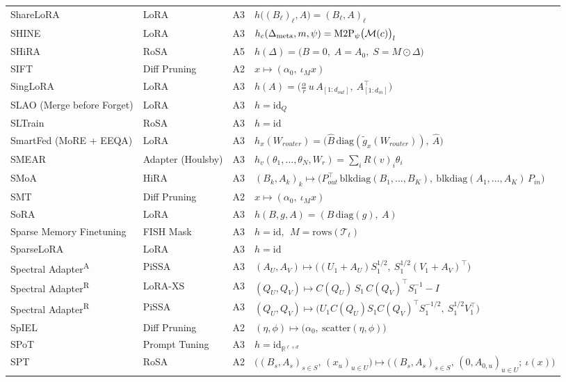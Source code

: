 \begin{longtable}{@{}>{\raggedright\arraybackslash}p{2.4cm}>{\raggedright\arraybackslash}p{2.4cm}c>{\raggedright\arraybackslash}p{8.6cm}@{}}
ShareLoRA & LoRA & A3 & $h\big((B_\ell)_\ell,A\big)=(B_\ell,A)_\ell$\\
SHINE & LoRA & A3 & $h_c(\Delta_{\rm meta},m,\psi)=\mathrm{M2P}_\psi\big(\mathcal M(c)\big)_l$\\
SHiRA & RoSA & A5 & $h(\Delta)=\big(B=0,\;A=A_0,\;S=M\odot\Delta\big)$\\
SIFT & Diff Pruning & A2 & $x\mapsto(\alpha_0,\ \iota_M x)$\\
SingLoRA & LoRA & A3 & $h(A)=\big(\tfrac\alpha r\,u\,A_{[1:d_{out}]},\ A_{[1:d_{in}]}^\top\big)$\\
SLAO (Merge before Forget) & LoRA & A3 & $h=\mathrm{id}_Q$\\
SLTrain & RoSA & A3 & $h=\mathrm{id}$\\
SmartFed (MoRE + EEQA) & LoRA & A3 & $h_x(W_{router})=\big(\widehat B\,\mathrm{diag}(\tilde g_x(W_{router})),\ \widehat A\big)$\\
SMEAR & Adapter (Houlsby) & A3 & $h_v(\theta_1,\dots,\theta_N,W_r)=\textstyle\sum_iR(v)_i\theta_i$\\
SMoA & HiRA & A3 & $(B_k,A_k)_k\mapsto\big(P_{out}^\top\,\mathrm{blkdiag}(B_1,\dots,B_K),\ \mathrm{blkdiag}(A_1,\dots,A_K)\,P_{in}\big)$\\
SMT & Diff Pruning & A2 & $x\mapsto(\alpha_0,\ \iota_M x)$\\
SoRA & LoRA & A3 & $h(B,g,A)=(B\,\mathrm{diag}(g),\ A)$\\
Sparse Memory Finetuning & FISH Mask & A3 & $h=\mathrm{id},\ \ M=\mathrm{rows}(\mathcal T_t)$\\
SparseLoRA & LoRA & A3 & $h=\mathrm{id}$\\
Spectral Adapter\textsuperscript{A} & PiSSA & A3 & $(A_U,A_V)\mapsto\big((U_1+A_U)S_1^{1/2},\ S_1^{1/2}(V_1+A_V)^\top\big)$\\
Spectral Adapter\textsuperscript{R} & LoRA-XS & A3 & $(Q_U,Q_V)\mapsto C(Q_U)\,S_1\,C(Q_V)^\top S_1^{-1}-I$\\
Spectral Adapter\textsuperscript{R} & PiSSA & A3 & $(Q_U,Q_V)\mapsto\big(U_1C(Q_U)S_1C(Q_V)^\top S_1^{-1/2},\ S_1^{1/2}V_1^\top\big)$\\
SpIEL & Diff Pruning & A2 & $(\eta,\phi)\mapsto\big(\alpha_0,\ \mathrm{scatter}(\eta,\phi)\big)$\\
SPoT & Prompt Tuning & A3 & $h=\mathrm{id}_{\mathbb R^{\ell\times d}}$\\
SPT & RoSA & A2 & $\big((B_s,A_s)_{s\in S},\,(x_u)_{u\in U}\big)\mapsto\big((B_s,A_s)_{s\in S},\,(0,A_{0,u})_{u\in U};\ \iota(x)\big)$\\

\end{longtable}
